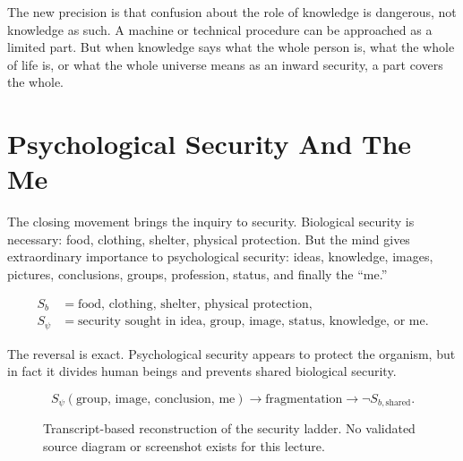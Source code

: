 \documentclass[11pt,oneside]{book}
\begin{document}
The new precision is that confusion about the role of knowledge is dangerous, not knowledge as such. A machine or technical procedure can be approached as a limited part. But when knowledge says what the whole person is, what the whole of life is, or what the whole universe means as an inward security, a part covers the whole.

\section{Psychological Security And The Me}

The closing movement brings the inquiry to security. Biological security is necessary: food, clothing, shelter, physical protection. But the mind gives extraordinary importance to psychological security: ideas, knowledge, images, pictures, conclusions, groups, profession, status, and finally the ``me.''

\begin{align}
S_b &= \text{food, clothing, shelter, physical protection},\\
S_{\psi} &= \text{security sought in idea, group, image, status, knowledge, or me}.
\end{align}

The reversal is exact. Psychological security appears to protect the organism, but in fact it divides human beings and prevents shared biological security.

\begin{equation}
S_{\psi}(\text{group, image, conclusion, me})
\longrightarrow
\text{fragmentation}
\longrightarrow
\neg S_{b,\mathrm{shared}}.
\end{equation}

\begin{figure}
\centering
{}

Transcript-based reconstruction of the security ladder. No validated source diagram or screenshot exists for this lecture.
\end{figure}
\end{document}
